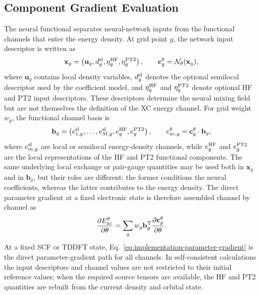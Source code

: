 \subsection{Component Gradient Evaluation}
\label{sec:implementation-component-gradients}

The neural functional separates neural-network inputs from the
functional channels that enter the energy density.  At grid point $g$,
the network input descriptor is written as
\begin{equation}
  \mathbf{x}_g
  =
  \left(
    \mathbf{u}_g,
    d^{\rm sl}_g,
    \eta^{\rm HF}_g,
    \eta^{\rm PT2}_g
  \right),
  \qquad
  \mathbf{c}^{\theta}_g
  =
  \mathcal{N}_{\theta}(\mathbf{x}_g),
  \label{eq:implementation-network-inputs}
\end{equation}
where $\mathbf{u}_g$ contains local density variables,
$d^{\rm sl}_g$ denotes the optional semilocal descriptor used by the
coefficient model, and $\eta^{\rm HF}_g$ and $\eta^{\rm PT2}_g$ denote
optional HF and PT2 input descriptors.  These descriptors determine
the neural mixing field but are not themselves the definition of the
XC energy channel.  For grid weight $w_g$, the functional channel basis
is
\begin{equation}
  \mathbf{b}_g
  =
  \left(
    e^{\rm sl}_{1,g},\ldots,e^{\rm sl}_{M,g},
    e^{\rm HF}_g,
    e^{\rm PT2}_g
  \right),
  \qquad
  e^{\theta}_{{\rm xc},g}
  =
  \mathbf{c}^{\theta}_g \cdot \mathbf{b}_g ,
  \label{eq:implementation-channel-basis}
\end{equation}
where $e^{\rm sl}_{m,g}$ are local or semilocal energy-density
channels, while $e^{\rm HF}_g$ and $e^{\rm PT2}_g$ are the local
representations of the HF and PT2 functional components.  The same
underlying local exchange or pair-gauge quantities may be used both in
$\mathbf{x}_g$ and in $\mathbf{b}_g$, but their roles are different:
the former conditions the neural coefficients, whereas the latter
contributes to the energy density.  The direct parameter gradient at a
fixed electronic state is therefore assembled channel by channel as
\begin{equation}
  \frac{\partial E^{\theta}_{\rm xc}}{\partial \theta}
  =
  \sum_g
  w_g
  \mathbf{b}_g^{\rm T}
  \frac{\partial \mathbf{c}^{\theta}_g}{\partial \theta}.
  \label{eq:implementation-parameter-gradient}
\end{equation}
At a fixed SCF or TDDFT state, Eq.~\eqref{eq:implementation-parameter-gradient}
is the direct parameter-gradient path for all channels.  In
self-consistent calculations the input descriptors and channel values
are not restricted to their initial reference values; when the required
source tensors are available, the HF and PT2 quantities are rebuilt
from the current density and orbital state.

